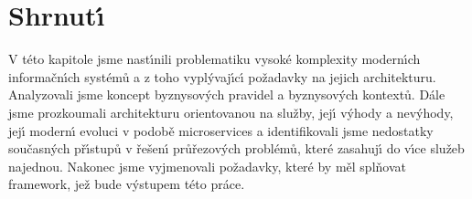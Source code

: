 \section{Shrnut\'{\i}}

V této kapitole jsme nast\'{\i}nili problematiku vysoké komplexity modern\'{\i}ch informačn\'{\i}ch systémů
a z toho vypl\'yvaj\'{\i}c\'{\i} požadavky na jejich architekturu. Analyzovali jsme koncept byznysov\'ych
pravidel a byznysov\'ych kontextů. Dále jsme prozkoumali architekturu orientovanou na služby, jej\'{\i}
v\'yhody a nev\'yhody, jej\'{\i} modern\'{\i} evoluci v podobě microservices a identifikovali jsme nedostatky
současn\'ych př\'{\i}stupů v řešen\'{\i} průřezov\'ych problémů, které zasahuj\'{\i} do v\'{\i}ce služeb najednou. Nakonec
jsme vyjmenovali požadavky, které by měl splňovat framework, jež bude v\'ystupem této práce.
